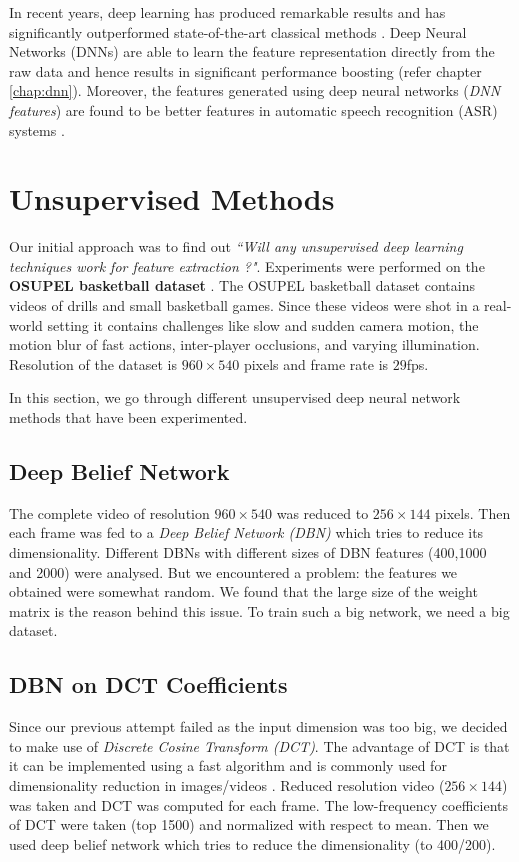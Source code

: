 In recent years, deep learning has produced remarkable results and has significantly outperformed state-of-the-art classical methods \cite{KarpathyCVPR14}.  Deep Neural Networks (DNNs) are able to learn the feature representation directly from the raw data and hence results in significant performance boosting (refer chapter \ref{chap:dnn}).  Moreover, the features generated using deep neural networks (\textit{DNN features}) are found to be better features in automatic speech recognition (ASR) systems \cite{yu2011improved,gehring2013extracting}.

\section{Unsupervised Methods}
\label{sec:event:unsupervised}
Our initial approach was to find out \textit{``Will any unsupervised deep learning techniques work for feature extraction ?"}.  Experiments were performed on the \textbf{OSUPEL basketball dataset} \cite{brendel2011probabilistic}.  The OSUPEL basketball dataset contains videos of drills and small basketball games.  Since these videos were shot in a real-world setting it contains challenges like slow and sudden camera motion, the motion blur of fast actions, inter-player occlusions, and varying illumination.  Resolution of the dataset is $960 \times 540$ pixels and frame rate is $29$fps.

In this section, we go through different unsupervised deep neural network methods that have been experimented.

\subsection{Deep Belief Network} 
The complete video of resolution $960 \times 540$ was reduced to $256 \times 144$ pixels.  Then each frame was fed to a \textit{Deep Belief Network (DBN)} which tries to reduce its dimensionality.  Different DBNs with different sizes of DBN features (400,1000 and 2000) were analysed.  But we encountered a problem: the features we obtained were somewhat random.  We found that the large size of the weight matrix is the reason behind this issue.  To train such a big network, we need a big dataset.

\subsection{DBN on DCT Coefficients}
Since our previous attempt failed as the input dimension was too big, we decided to make use of \textit{Discrete Cosine Transform (DCT)}.  The advantage of DCT is that it can be implemented using a fast algorithm and is commonly used for dimensionality reduction in images/videos \cite{er2005high}.  Reduced resolution video ($256 \times 144$) was taken and DCT was computed for each frame.  The low-frequency coefficients of DCT were taken (top 1500) and normalized with respect to mean.  Then we used deep belief network which tries to reduce the dimensionality (to 400/200).

